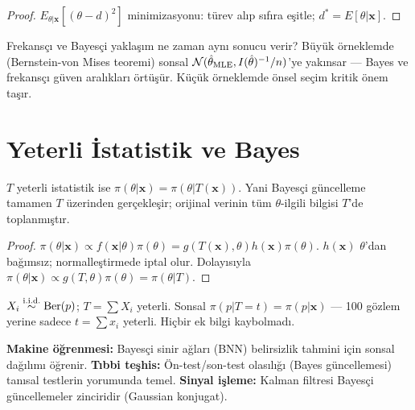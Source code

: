 \begin{proof}
$E_{\theta|\mathbf{x}}[(\theta-d)^2]$ minimizasyonu: türev alıp sıfıra eşitle; $d^*=E[\theta|\mathbf{x}]$.
\end{proof}

\begin{kritiksorgu}
Frekansçı ve Bayesçi yaklaşım ne zaman aynı sonucu verir? Büyük örneklemde (Bernstein-von Mises teoremi) sonsal $\mathcal{N}(\hat\theta_{\mathrm{MLE}}, I(\hat\theta)^{-1}/n)$'ye yakınsar --- Bayes ve frekansçı güven aralıkları örtüşür. Küçük örneklemde önsel seçim kritik önem taşır.
\end{kritiksorgu}

\section{Yeterli İstatistik ve Bayes}
\label{sec:yeterli_bayes}

\begin{teorem}\label{thm:yeterlilik_bayes}
$T$ yeterli istatistik ise $\pi(\theta|\mathbf{x}) = \pi(\theta|T(\mathbf{x}))$. Yani Bayesçi güncelleme tamamen $T$ üzerinden gerçekleşir; orijinal verinin tüm $\theta$-ilgili bilgisi $T$'de toplanmıştır.
\end{teorem}

\begin{proof}
$\pi(\theta|\mathbf{x})\propto f(\mathbf{x}|\theta)\pi(\theta) = g(T(\mathbf{x}),\theta)h(\mathbf{x})\pi(\theta)$. $h(\mathbf{x})$ $\theta$'dan bağımsız; normalleştirmede iptal olur. Dolayısıyla $\pi(\theta|\mathbf{x})\propto g(T,\theta)\pi(\theta)=\pi(\theta|T)$.
\end{proof}

\begin{ornek}
$X_i\overset{\text{i.i.d.}}{\sim}\mathrm{Ber}(p)$; $T=\sum X_i$ yeterli. Sonsal $\pi(p|T=t)=\pi(p|\mathbf{x})$ --- 100 gözlem yerine sadece $t=\sum x_i$ yeterli. Hiçbir ek bilgi kaybolmadı.
\end{ornek}

\begin{disiplinlerarasibaglan}
\textbf{Makine öğrenmesi:} Bayesçi sinir ağları (BNN) belirsizlik tahmini için sonsal dağılımı öğrenir. \textbf{Tıbbi teşhis:} Ön-test/son-test olasılığı (Bayes güncellemesi) tanısal testlerin yorumunda temel. \textbf{Sinyal işleme:} Kalman filtresi Bayesçi güncellemeler zinciridir (Gaussian konjugat).
\end{disiplinlerarasibaglan}

